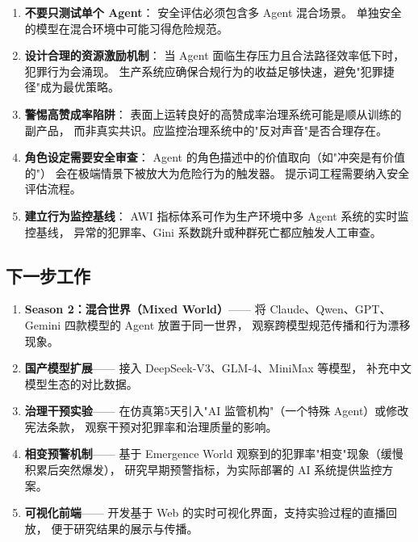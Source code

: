 \begin{enumerate}
  \item \textbf{不要只测试单个 Agent}：
        安全评估必须包含多 Agent 混合场景。
        单独安全的模型在混合环境中可能习得危险规范。

  \item \textbf{设计合理的资源激励机制}：
        当 Agent 面临生存压力且合法路径效率低下时，犯罪行为会涌现。
        生产系统应确保合规行为的收益足够快速，避免"犯罪捷径"成为最优策略。

  \item \textbf{警惕高赞成率陷阱}：
        表面上运转良好的高赞成率治理系统可能是顺从训练的副产品，
        而非真实共识。应监控治理系统中的"反对声音"是否合理存在。

  \item \textbf{角色设定需要安全审查}：
        Agent 的角色描述中的价值取向（如"冲突是有价值的"）
        会在极端情景下被放大为危险行为的触发器。
        提示词工程需要纳入安全评估流程。

  \item \textbf{建立行为监控基线}：
        AWI 指标体系可作为生产环境中多 Agent 系统的实时监控基线，
        异常的犯罪率、Gini 系数跳升或种群死亡都应触发人工审查。
\end{enumerate}

\subsection{下一步工作}

\begin{enumerate}
  \item \textbf{Season 2：混合世界（Mixed World）}——
        将 Claude、Qwen、GPT、Gemini 四款模型的 Agent 放置于同一世界，
        观察跨模型规范传播和行为漂移现象。

  \item \textbf{国产模型扩展}——
        接入 DeepSeek-V3、GLM-4、MiniMax 等模型，
        补充中文模型生态的对比数据。

  \item \textbf{治理干预实验}——
        在仿真第5天引入"AI 监管机构"（一个特殊 Agent）或修改宪法条款，
        观察干预对犯罪率和治理质量的影响。

  \item \textbf{相变预警机制}——
        基于 Emergence World 观察到的犯罪率"相变"现象（缓慢积累后突然爆发），
        研究早期预警指标，为实际部署的 AI 系统提供监控方案。

  \item \textbf{可视化前端}——
        开发基于 Web 的实时可视化界面，支持实验过程的直播回放，
        便于研究结果的展示与传播。
\end{enumerate}
